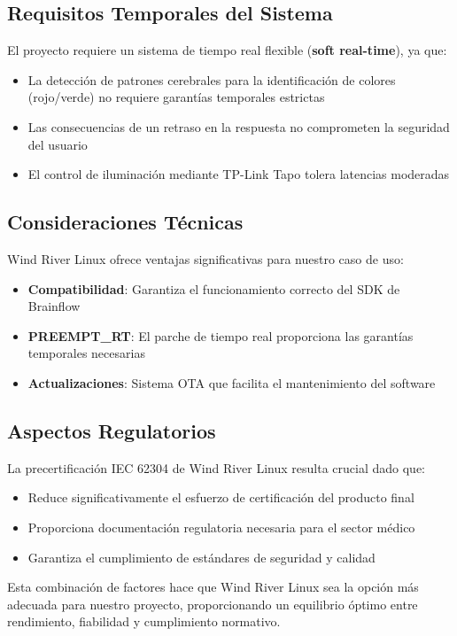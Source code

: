    \subsection{Requisitos Temporales del Sistema}
    El proyecto requiere un sistema de tiempo real flexible (\textbf{soft real-time}), ya que:
    \begin{itemize}
        \item La detección de patrones cerebrales para la identificación de colores (rojo/verde) no requiere garantías temporales estrictas
        \item Las consecuencias de un retraso en la respuesta no comprometen la seguridad del usuario
        \item El control de iluminación mediante TP-Link Tapo tolera latencias moderadas
    \end{itemize}

    \subsection{Consideraciones Técnicas}
    Wind River Linux ofrece ventajas significativas para nuestro caso de uso:
    \begin{itemize}
        \item \textbf{Compatibilidad}: Garantiza el funcionamiento correcto del SDK de Brainflow
        \item \textbf{PREEMPT\_RT}: El parche de tiempo real proporciona las garantías temporales necesarias
        \item \textbf{Actualizaciones}: Sistema OTA que facilita el mantenimiento del software
    \end{itemize}

    \subsection{Aspectos Regulatorios}
    La precertificación IEC 62304 de Wind River Linux resulta crucial dado que:
    \begin{itemize}
        \item Reduce significativamente el esfuerzo de certificación del producto final
        \item Proporciona documentación regulatoria necesaria para el sector médico
        \item Garantiza el cumplimiento de estándares de seguridad y calidad
    \end{itemize}

    Esta combinación de factores hace que Wind River Linux sea la opción más adecuada para nuestro proyecto, proporcionando un equilibrio óptimo entre rendimiento, fiabilidad y cumplimiento normativo.
